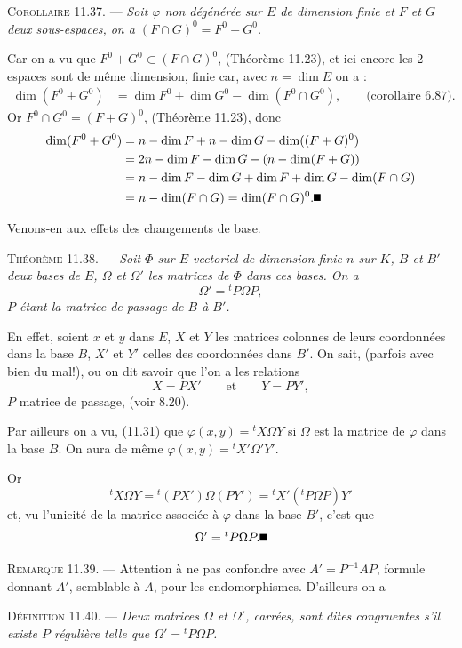 \medskip\noindent\textsc{Corollaire 11.37.} --- \emph{Soit $\varphi$ non dégénérée sur $E$ de dimension finie et $F$ et $G$ deux sous-espaces, on a $(F\cap G)^0=F^0+G^0$.}

Car on a vu que $F^0+G^0\subset(F\cap G)^0$, (Théorème 11.23), et ici encore les 2 espaces sont de même dimension, finie car, avec $n=\dim E$ on a :
\begin{align*}
\dim(F^0+G^0)
 &=\dim F^0+\dim G^0-\dim(F^0\cap G^0),\qquad\text{(corollaire 6.87).}
\end{align*}
Or $F^0\cap G^0=(F+G)^0$, (Théorème 11.23), donc
\begin{align*}
\dim(F^0+G^0)
 &=n-\dim F+n-\dim G-\dim((F+G)^0)\\
 &=2n-\dim F-\dim G-(n-\dim(F+G))\\
 &=n-\dim F-\dim G+\dim F+\dim G-\dim(F\cap G)\\
 &=n-\dim(F\cap G)=\dim(F\cap G)^0. \bookend
\end{align*}

Venons-en aux effets des changements de base.

\medskip\noindent\textsc{Théorème 11.38.} --- \emph{Soit $\Phi$  sur $E$ vectoriel de dimension finie $n$ sur $K$, $B$ et $B'$ deux bases de $E$, $\Omega$ et $\Omega'$ les matrices de $\Phi$ dans ces bases. On a
\[
\Omega'={}^tP\Omega P,
\]
$P$ étant la matrice de passage de $B$ à $B'$.}

En effet, soient $x$ et $y$ dans $E$, $X$ et $Y$ les matrices colonnes de leurs coordonnées dans la base $B$, $X'$ et $Y'$ celles des coordonnées dans $B'$. On sait, (parfois avec bien du mal!), ou on dit savoir que l'on a les relations
\[
X=PX'\qquad\text{et}\qquad Y=PY',
\]
$P$ matrice de passage, (voir 8.20).

Par ailleurs on a vu, (11.31) que $\varphi(x,y)={}^tX\Omega Y$ si $\Omega$ est la matrice de $\varphi$ dans la base $B$. On aura de même $\varphi(x,y)={}^tX'\Omega'Y'$.

Or
\[
{}^tX\Omega Y={}^t(PX')\Omega(PY')={}^tX'({}^tP\Omega P)Y'
\]
et, vu l'unicité de la matrice associée à $\varphi$ dans la base $B'$, c'est que
\[
\Omega'={}^tP\Omega P. \bookend
\]

\medskip\noindent\textsc{Remarque 11.39.} --- Attention à ne pas confondre avec $A'=P^{-1}AP$, formule donnant $A'$, semblable à $A$, pour les endomorphismes. D'ailleurs on a

\medskip\noindent\textsc{Définition 11.40.} --- \emph{Deux matrices $\Omega$ et $\Omega'$, carrées, sont dites congruentes s'il existe $P$ régulière telle que $\Omega'={}^tP\Omega P$.}

